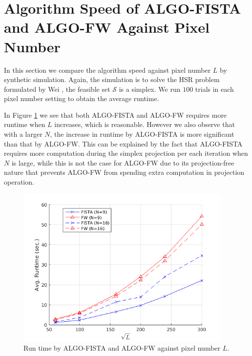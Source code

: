 \clearpage
\section{Algorithm Speed of ALGO-FISTA and ALGO-FW Against Pixel Number}
In this section we compare the algorithm speed against pixel number $L$ by
synthetic simulation.
Again, the simulation is to solve the HSR problem formulated by Wei \etal, \ie
the feasible set $\mathcal S$ is a simplex.
We run $100$ trials in each pixel number setting to obtain the average runtime.

In Figure \ref{fig:ALGO_vs_L_speed} we see that both ALGO-FISTA and ALGO-FW
requires more runtime when $L$ increases, which is reasonable.
However we also observe that with a larger $N$, the increase in runtime by
ALGO-FISTA is more significant than that by ALGO-FW.
This can be explained by the fact that ALGO-FISTA requires more computation
during the simplex projection per each iteration when $N$ is large, while this
is not the case for ALGO-FW due to its projection-free nature that prevents
ALGO-FW from spending extra computation in projection operation.

\begin{figure}[h] \centering \includegraphics[width=0.95\textwidth]{./fig/fig_04Expt/74_TGRS_EXPT11_FUMI_PIX_EFFECT/en_var_ab_var/DS4/SNR_40dB/run_time_against_pixelnum} \caption{Run time by ALGO-FISTA and ALGO-FW against pixel number $L$.} \label{fig:ALGO_vs_L_speed} \end{figure}
